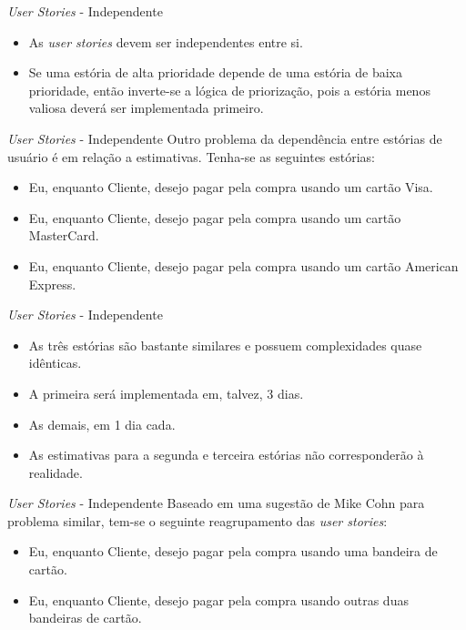 \documentclass[11pt]{beamer}
\begin{document}
   \begin{frame}{\textit{User Stories} - Independente}
      \begin{itemize}
         \item As \textit{user stories} devem ser independentes entre si.
         \item Se uma estória de alta prioridade depende de uma estória de baixa prioridade, então inverte-se a lógica de priorização, pois a estória menos valiosa deverá ser implementada primeiro.
      \end{itemize}
   \end{frame}

   \begin{frame}{\textit{User Stories} - Independente}
      Outro problema da dependência entre estórias de usuário é em relação a estimativas. Tenha-se as seguintes estórias:
      \begin{itemize}
         \item Eu, enquanto Cliente, desejo pagar pela compra usando um cartão Visa.
         \item Eu, enquanto Cliente, desejo pagar pela compra usando um cartão MasterCard.
         \item Eu, enquanto Cliente, desejo pagar pela compra usando um cartão American Express.
      \end{itemize}
   \end{frame}

   \begin{frame}{\textit{User Stories} - Independente}
      \begin{itemize}
         \item As três estórias são bastante similares e possuem complexidades quase idênticas.
         \item A primeira será implementada em, talvez, 3 dias.
         \item As demais, em 1 dia cada. 
         \item As estimativas para a segunda e terceira estórias não corresponderão à realidade.
      \end{itemize}
   \end{frame}

   \begin{frame}{\textit{User Stories} - Independente}
      Baseado em uma sugestão de Mike Cohn para problema similar, tem-se o seguinte reagrupamento das \textit{user stories}:
      \begin{itemize}
         \item Eu, enquanto Cliente, desejo pagar pela compra usando uma bandeira de cartão.
         \item Eu, enquanto Cliente, desejo pagar pela compra usando outras duas bandeiras de cartão.
      \end{itemize}
   \end{frame}
\end{document}
